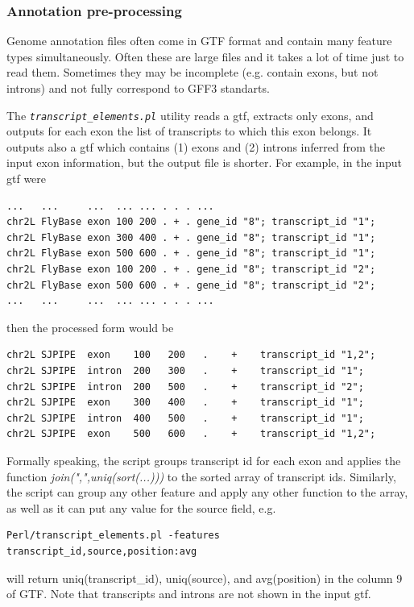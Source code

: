 \documentclass{article}
\newcommand{\prog}[1]{{\tt\em #1}}
\begin{document}
\subsubsection{Annotation pre-processing}
\label{sec::preprocessing}
Genome annotation files often come in GTF format and contain many feature types simultaneously. Often these are large files and it takes a lot of 
time just to read them. Sometimes they may be incomplete (e.g. contain exons, but not introns) and not fully correspond to GFF3 standarts.

The \prog{transcript\_elements.pl} utility reads a gtf, extracts only exons, and outputs for each exon the list of transcripts to which this exon 
belongs. It outputs also a gtf which contains (1) exons and (2) introns inferred from the input exon information, but the output file is shorter.
For example, in the input gtf were
\begin{verbatim} 
...   ...     ...  ... ... . . . ...      
chr2L FlyBase exon 100 200 . + . gene_id "8"; transcript_id "1";
chr2L FlyBase exon 300 400 . + . gene_id "8"; transcript_id "1"; 
chr2L FlyBase exon 500 600 . + . gene_id "8"; transcript_id "1"; 
chr2L FlyBase exon 100 200 . + . gene_id "8"; transcript_id "2"; 
chr2L FlyBase exon 500 600 . + . gene_id "8"; transcript_id "2"; 
...   ...     ...  ... ... . . . ...
\end{verbatim}
then the processed form would be
\begin{verbatim} 
chr2L SJPIPE  exon    100   200   .    +    transcript_id "1,2";
chr2L SJPIPE  intron  200   300   .    +    transcript_id "1";
chr2L SJPIPE  intron  200   500   .    +    transcript_id "2";
chr2L SJPIPE  exon    300   400   .    +    transcript_id "1";
chr2L SJPIPE  intron  400   500   .    +    transcript_id "1";
chr2L SJPIPE  exon    500   600   .    +    transcript_id "1,2";
\end{verbatim}

Formally speaking, the script groups transcript id for each exon and applies the function {\em join(",",uniq(sort(...)))} to the sorted array of transcript ids. 
Similarly, the script can group any other feature and apply any other function to the array, as well as it can put any value for the source field, e.g.
\begin{verbatim}
Perl/transcript_elements.pl -features transcript_id,source,position:avg
\end{verbatim}
will return uniq(transcript\_id), uniq(source), and avg(position) in the column 9 of GTF. Note that transcripts and introns are not shown in the input gtf. 
\end{document}
